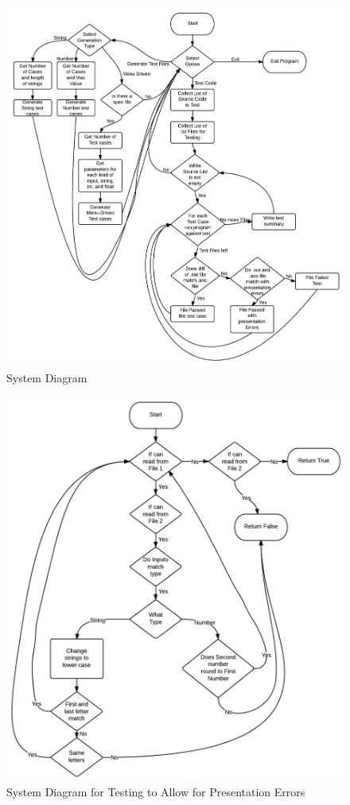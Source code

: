 \begin {figure}[tbh]
\begin {center}
\includegraphics[width=1\textwidth]{./SystemDiagram}
\end{center}
\caption{System Diagram\label{systemdiagram}}
\end{figure}

\begin{figure}[tbh]
\begin{center}
\includegraphics[width=1\textwidth]{./SystemDiagram2}
\end{center}
\caption{System Diagram for Testing to Allow for Presentation Errors\label{systemdiagram2}}
\end{figure}

